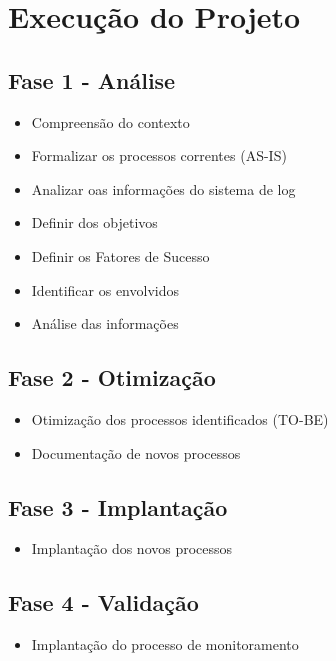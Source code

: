 \section{Execução do Projeto}
\subsection{Fase 1 - Análise}
\begin{itemize}[noitemsep]
	\item Compreensão do contexto
	\item Formalizar os processos correntes (AS-IS)
	\item Analizar oas informações do sistema de log
	\item Definir dos objetivos
	\item Definir os Fatores de Sucesso
	\item Identificar os envolvidos
	\item Análise das informações
\end{itemize}
\subsection{Fase 2 - Otimização}
\begin{itemize}[noitemsep]
	\item Otimização dos processos identificados (TO-BE)
	\item Documentação de novos processos
\end{itemize}
\subsection{Fase 3 - Implantação}
\begin{itemize}[noitemsep]
	\item  Implantação dos novos processos
\end{itemize}

\subsection{Fase 4 - Validação}
\begin{itemize}[noitemsep]
	\item Implantação do processo de monitoramento
\end{itemize}

